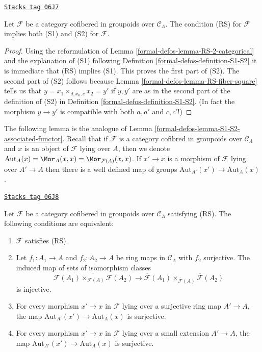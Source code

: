 \begin{lemma}[RS implies S1 S2]
\label{formal-defos-lemma-RS-implies-S1-S2}
\href{https://stacks.math.columbia.edu/tag/06J7}{\texttt{Stacks tag 06J7}}

Let $\mathcal{F}$ be a category cofibered in groupoids over
$\mathcal{C}_\Lambda$. The condition (RS) for $\mathcal{F}$
implies both (S1) and (S2) for $\mathcal{F}$.
\end{lemma}

\begin{proof}
Using the reformulation of
Lemma \ref{formal-defos-lemma-RS-2-categorical}
and the explanation of (S1) following
Definition \ref{formal-defos-definition-S1-S2}
it is immediate that (RS) implies (S1).
This proves the first part of (S2). The second part of (S2)
follows because
Lemma \ref{formal-defos-lemma-RS-fiber-square}
tells us that $y = x_1 \times_{d, x_0, e} x_2 = y'$ if
$y, y'$ are as in the second part of the definition of (S2) in
Definition \ref{formal-defos-definition-S1-S2}. (In fact the morphism
$y \to y'$ is compatible with both $a, a'$ and $c, c'$!)
\end{proof}

The following lemma is the analogue of
Lemma \ref{formal-defos-lemma-S1-S2-associated-functor}.
Recall that if $\mathcal{F}$ is a category cofibred in groupoids over
$\mathcal{C}_\Lambda$ and $x$ is an object of $\mathcal{F}$
lying over $A$, then we denote
$\text{Aut}_A(x) = \Mor_A(x, x) = \Mor_{\mathcal{F}(A)}(x, x)$.
If $x' \to x$ is a morphism of $\mathcal{F}$ lying over $A' \to A$
then there is a well defined map of groups
$\text{Aut}_{A'}(x') \to \text{Aut}_A(x)$.

\begin{lemma}
\label{formal-defos-lemma-RS-associated-functor}
\href{https://stacks.math.columbia.edu/tag/06J8}{\texttt{Stacks tag 06J8}}

Let $\mathcal{F}$ be a category cofibered in groupoids over
$\mathcal{C}_\Lambda$ satisfying (RS).
The following conditions are equivalent:
\begin{enumerate}
\item $\overline{\mathcal{F}}$ satisfies (RS).
\item Let $f_1: A_1 \to A$ and $f_2: A_2 \to A$ be ring maps in
$\mathcal{C}_\Lambda$ with $f_2$ surjective. The induced map
of sets of isomorphism classes
$$
\overline{\mathcal{F}(A_1) \times_{\mathcal{F}(A)} \mathcal{F}(A_2)}
\to \overline{\mathcal{F}}(A_1) \times_{\overline{\mathcal{F}}(A)}
\overline{\mathcal{F}}(A_2)
$$
is injective.
\item For every morphism $x' \to x$ in $\mathcal{F}$ lying over a
surjective ring map $A' \to A$, the map
$\text{Aut}_{A'}(x') \to \text{Aut}_A(x)$ is surjective.
\item For every morphism $x' \to x$ in $\mathcal{F}$ lying over a small
extension $A' \to A$, the map
$\text{Aut}_{A'}(x') \to \text{Aut}_A(x)$ is surjective.
\end{enumerate}
\end{lemma}

